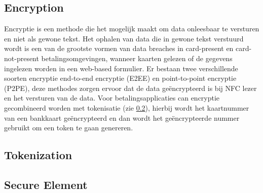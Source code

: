 \subsection{Encryption}
Encryptie is een methode die het mogelijk maakt om data onleesbaar te versturen en niet als gewone tekst. Het ophalen van data die in gewone tekst verstuurd wordt is een van de grootste vormen van data breaches in card-present en card-not-present betalingsomgevingen, wanneer kaarten gelezen of de gegevens ingelezen worden in een web-based formulier. Er bestaan twee verschillende soorten encryptie end-to-end encryptie (E2EE) en point-to-point encryptie (P2PE), deze methodes zorgen ervoor dat de data geëncrypteerd is bij NFC lezer en het versturen van de data. Voor betalingsapplicaties can encryptie gecombineerd worden met tokenisatie (zie \ref{subsec:tok}), hierbij wordt het kaartnummer van een bankkaart geëncrypteerd en dan wordt het geëncrypteerde nummer gebruikt om een token te gaan genereren.

\subsection{Tokenization}
\label{subsec:tok}

\subsection{Secure Element}

